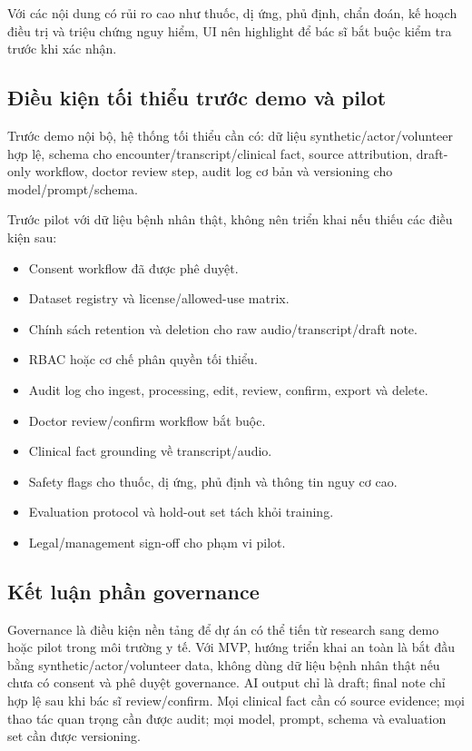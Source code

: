 \documentclass[12pt,a4paper]{article}
\begin{document}
Với các nội dung có rủi ro cao như thuốc, dị ứng, phủ định, chẩn đoán, kế hoạch điều trị và triệu chứng nguy hiểm, UI nên highlight để bác sĩ bắt buộc kiểm tra trước khi xác nhận.

\subsection{Điều kiện tối thiểu trước demo và pilot}

Trước demo nội bộ, hệ thống tối thiểu cần có: dữ liệu synthetic/actor/volunteer hợp lệ, schema cho encounter/transcript/clinical fact, source attribution, draft-only workflow, doctor review step, audit log cơ bản và versioning cho model/prompt/schema.

Trước pilot với dữ liệu bệnh nhân thật, không nên triển khai nếu thiếu các điều kiện sau:

\begin{itemize}
    \item Consent workflow đã được phê duyệt.
    \item Dataset registry và license/allowed-use matrix.
    \item Chính sách retention và deletion cho raw audio/transcript/draft note.
    \item RBAC hoặc cơ chế phân quyền tối thiểu.
    \item Audit log cho ingest, processing, edit, review, confirm, export và delete.
    \item Doctor review/confirm workflow bắt buộc.
    \item Clinical fact grounding về transcript/audio.
    \item Safety flags cho thuốc, dị ứng, phủ định và thông tin nguy cơ cao.
    \item Evaluation protocol và hold-out set tách khỏi training.
    \item Legal/management sign-off cho phạm vi pilot.
\end{itemize}

\subsection{Kết luận phần governance}

Governance là điều kiện nền tảng để dự án có thể tiến từ research sang demo hoặc pilot trong môi trường y tế. Với MVP, hướng triển khai an toàn là bắt đầu bằng synthetic/actor/volunteer data, không dùng dữ liệu bệnh nhân thật nếu chưa có consent và phê duyệt governance. AI output chỉ là draft; final note chỉ hợp lệ sau khi bác sĩ review/confirm. Mọi clinical fact cần có source evidence; mọi thao tác quan trọng cần được audit; mọi model, prompt, schema và evaluation set cần được versioning.
\end{document}
